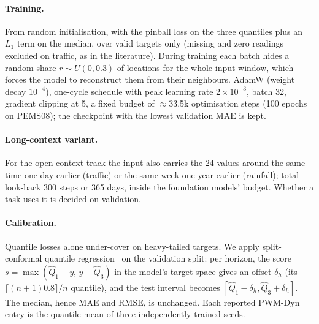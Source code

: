 \paragraph{Training.} From random initialisation, with the pinball loss on the three quantiles plus an $L_1$ term on
the median, over valid targets only (missing and zero readings excluded on traffic, as in the literature).
During training each batch hides a random share $r\sim U(0, 0.3)$ of locations for the whole input window,
which forces the model to reconstruct them from their neighbours. AdamW (weight decay $10^{-4}$), one-cycle schedule with peak learning rate $2\times10^{-3}$, batch 32, gradient
clipping at 5, a fixed budget of $\approx$33.5k optimisation steps (100 epochs on PEMS08); the checkpoint with the
lowest validation MAE is kept.

\paragraph{Long-context variant.} For the open-context track the input also carries the 24 values around the same
time one day earlier (traffic) or the same week one year earlier (rainfall); total look-back 300 steps or 365 days,
inside the foundation models' budget. Whether a task uses it is decided on validation.

\paragraph{Calibration.} Quantile losses alone under-cover on heavy-tailed targets. We apply split-conformal
quantile regression~\citep{romano2019cqr} on the validation split: per horizon, the score
$s=\max(\hat Q_1-y,\,y-\hat Q_3)$ in the model's target space gives an offset $\delta_h$ (its $\lceil (n+1)0.8\rceil/n$
quantile), and the test interval becomes $[\hat Q_1-\delta_h,\hat Q_3+\delta_h]$. The median, hence MAE and RMSE,
is unchanged. Each reported PWM-Dyn entry is the quantile mean of three independently trained seeds.
